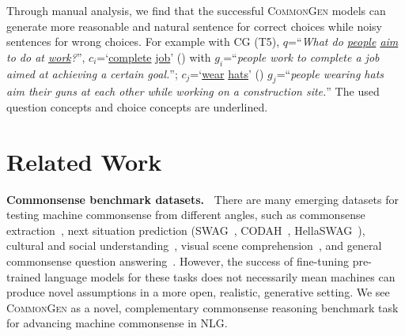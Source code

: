 \documentclass[11pt,a4paper]{article}
\begin{document}
     
    Through manual analysis, we find that the successful \textsc{CommonGen} models can generate more reasonable and natural sentence for correct choices while noisy sentences for wrong choices.
    For example with CG (T5), $q$=``\textit{What do \underline{people} \underline{aim} to do at \underline{work}?}'',  $c_i$=`\underline{complete} \underline{job}' (\cmark) with $g_i$=``\textit{people work to complete a job aimed at achieving a certain goal.}''; 
    $c_j$=`\underline{wear} \underline{hats}' (\xmark) $g_j$=``\textit{people wearing hats aim their guns at each other while working on a construction site.}''
	The used question concepts and choice concepts are {underlined}.
			 
	






	


	
	






 	\section{Related Work}
	\label{sec:relatedwork}
	\noindent
	\textbf{Commonsense benchmark datasets.~}
There are many emerging datasets for testing machine commonsense from different angles,
	such as commonsense extraction~\cite{Xu2018AutomaticEO,Li2016CommonsenseKB}, next situation prediction ({SWAG}~\cite{Zellers2018SWAGAL}, CODAH~\cite{Chen2019CODAHAA}, HellaSWAG~\cite{Zellers2019HellaSwagCA}), cultural and social understanding~\cite{Lin2018MiningCD, sap2018atomic, sap-etal-2019-social}, visual scene comprehension~\cite{Zellers2019FromRT}, and general commonsense question answering~\cite{Talmor2018CommonsenseQAAQ, huang-etal-2019-cosmos, wang-etal-2019-make,wang-etal-2020-semeval}. 
	   However, the success of fine-tuning pre-trained language models for these tasks does not necessarily mean machines can produce novel assumptions in a more open, realistic, generative setting.
	We see \textsc{CommonGen} as a novel, complementary  commonsense reasoning benchmark task for advancing machine commonsense in NLG.


    
   
	
	
\end{document}
